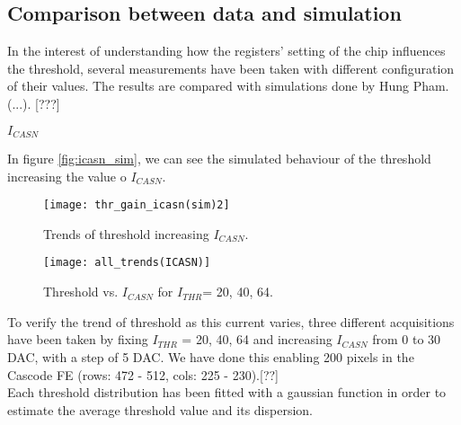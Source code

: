 \begin{comment}
pag.97 tesi
This modification has significant consequences in several design aspects such as the bandwidth, gain, noise and threshold dispersion resulting in a different front-end behavior
\end{comment}


\subsection{Comparison between data and simulation}

In the interest of understanding how the registers' setting of the chip influences the threshold, several measurements have been taken with different configuration of their values.
The results are compared with simulations done by Hung Pham.  (...). [???]

\begin{description}
\item[\textbf{$I_{CASN}$}] 
\end{description}

In figure \vref{fig:icasn_sim}, we can see the simulated behaviour of the threshold increasing the value o $I_{CASN}$.

\begin{figure}[h!]
\centering
\texttt{[image: thr\_gain\_icasn(sim)2]}
\caption{Trends of threshold increasing $I_{CASN}$.}
\label{fig:icasn_sim}
\end{figure}

\begin{figure}[h!]
\centering
\texttt{[image: all\_trends(ICASN)]}
\caption{Threshold vs. $I_{CASN}$ for $I_{THR}$= 20, 40, 64.}
\label{fig:alltrends_icasn}
\end{figure}

To verify the trend of threshold as this current varies, three different acquisitions have been taken by fixing $I_{THR}$ = 20, 40, 64 and increasing $I_{CASN}$ from 0  to 30 DAC, with a step of 5 DAC. We have done this enabling 200 pixels in the Cascode FE (rows: 472 - 512, cols: 225 - 230).[??]\\

Each threshold distribution has been fitted with a gaussian function in order to estimate the average threshold value and its dispersion.


